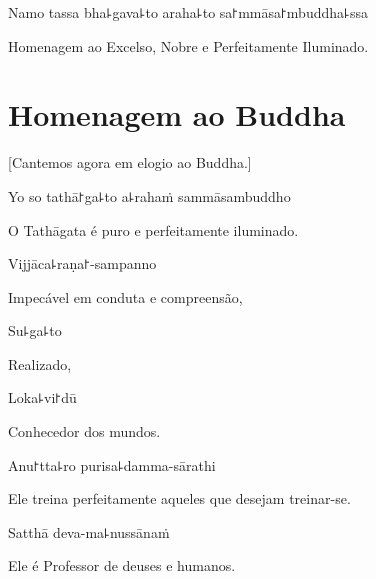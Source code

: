 Namo tassa bha꜕gava꜕to araha꜕to sa꜓mmāsa꜓mbuddha꜕ssa


\begin{english}
  Homenagem ao Excelso, Nobre e Perfeitamente Iluminado.

\end{english}

\clearpage

\chapter{Homenagem ao Buddha}

\begin{leader}
\end{leader}

\begin{english}
  [Cantemos agora em elogio ao Buddha.]
\end{english}

Yo so tathā꜓ga꜕to a꜕rahaṁ sammāsambuddho

\begin{english}
  O Tathāgata é puro e perfeitamente iluminado.
\end{english}

Vijjāca꜕raṇa꜓-sampanno

\begin{english}
  Impecável em conduta e compreensão,
\end{english}

Su꜕ga꜕to

\begin{english}
  Realizado,
\end{english}

Loka꜕vi꜓dū

\begin{english}
  Conhecedor dos mundos.
\end{english}

Anu꜓tta꜕ro purisa꜕damma-sārathi

\begin{english}
  Ele treina perfeitamente aqueles que desejam treinar-se.
\end{english}

Satthā deva-ma꜕nussānaṁ

\begin{english}
  Ele é Professor de deuses e humanos.
\end{english}

